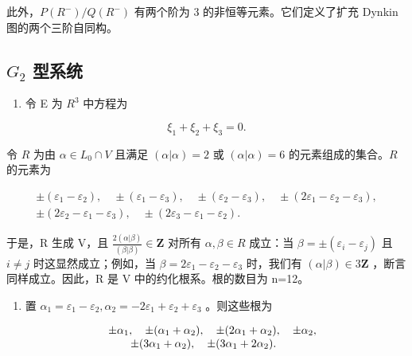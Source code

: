 此外，\(P(R^{-})/Q(R^{-})\) 有两个阶为 3 的非恒等元素。它们定义了扩充 Dynkin 图的两个三阶自同构。

\subsection{\texorpdfstring{\(G_{2}\) 型系统}{G\_2 型系统}}

\begin{enumerate}
\def\labelenumi{(\Roman{enumi})}
\tightlist
\item
  令 E 为 \(R^{3}\) 中方程为
\end{enumerate}

\[
\xi_ {1} + \xi_ {2} + \xi_ {3} = 0.
\]

  令 \(R\) 为由 \(\alpha \in L_0 \cap V\) 且满足 \((\alpha | \alpha) = 2\) 或 \((\alpha | \alpha) = 6\) 的元素组成的集合。\(R\) 的元素为

\[
\begin{array}{c} \pm (\varepsilon_ {1} - \varepsilon_ {2}), \quad \pm (\varepsilon_ {1} - \varepsilon_ {3}), \quad \pm (\varepsilon_ {2} - \varepsilon_ {3}), \quad \pm (2 \varepsilon_ {1} - \varepsilon_ {2} - \varepsilon_ {3}), \\ \pm (2 \varepsilon_ {2} - \varepsilon_ {1} - \varepsilon_ {3}), \quad \pm (2 \varepsilon_ {3} - \varepsilon_ {1} - \varepsilon_ {2}). \end{array}
\]

  于是，R 生成 V，且 \(\frac{2(\alpha|\beta)}{(\beta|\beta)}\in\mathbf{Z}\) 对所有 \(\alpha,\beta\in R\) 成立：当 \(\beta=\pm(\varepsilon_{i}-\varepsilon_{j})\) 且 \(i\neq j\) 时这显然成立；例如，当 \(\beta=2\varepsilon_{1}-\varepsilon_{2}-\varepsilon_{3}\) 时，我们有 \((\alpha|\beta)\in3\mathbf{Z}\) ，断言同样成立。因此，R 是 V 中的约化根系。根的数目为 n=12。

\begin{enumerate}
\def\labelenumi{(\Roman{enumi})}
\setcounter{enumi}{1}
\tightlist
\item
  置 \(\alpha_{1} = \varepsilon_{1} - \varepsilon_{2},\alpha_{2} = -2\varepsilon_{1} + \varepsilon_{2} + \varepsilon_{3}\) 。则这些根为
\end{enumerate}

\[
\begin{array}{r l} & {\pm \alpha_ {1}, \quad \pm (\alpha_ {1} + \alpha_ {2}), \quad \pm (2 \alpha_ {1} + \alpha_ {2}), \quad \pm \alpha_ {2},} \\ & {\qquad \pm (3 \alpha_ {1} + \alpha_ {2}), \quad \pm (3 \alpha_ {1} + 2 \alpha_ {2}).} \end{array}
\]

